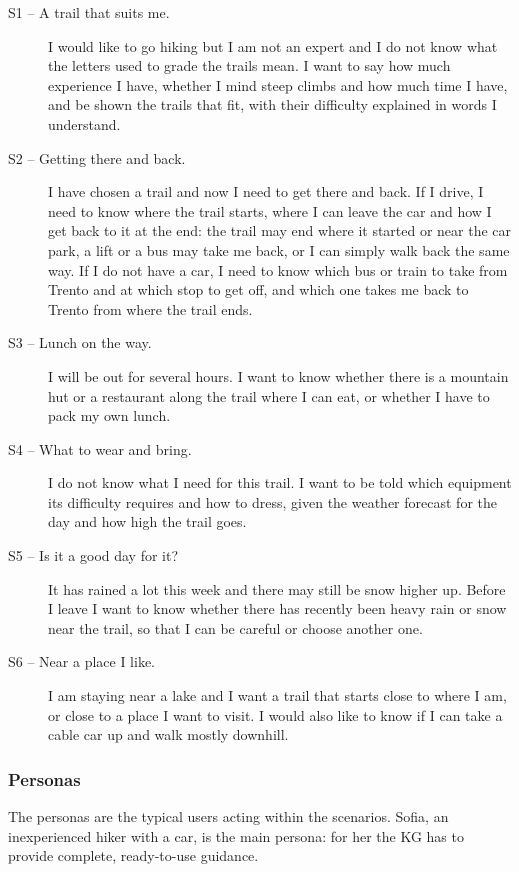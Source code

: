 \begin{description}
    \item[S1 -- A trail that suits me.] I would like to go hiking but I am not an expert and I do not know what the letters used to grade the trails mean. I want to say how much experience I have, whether I mind steep climbs and how much time I have, and be shown the trails that fit, with their difficulty explained in words I understand.
    \item[S2 -- Getting there and back.] I have chosen a trail and now I need to get there and back. If I drive, I need to know where the trail starts, where I can leave the car and how I get back to it at the end: the trail may end where it started or near the car park, a lift or a bus may take me back, or I can simply walk back the same way. If I do not have a car, I need to know which bus or train to take from Trento and at which stop to get off, and which one takes me back to Trento from where the trail ends.
    \item[S3 -- Lunch on the way.] I will be out for several hours. I want to know whether there is a mountain hut or a restaurant along the trail where I can eat, or whether I have to pack my own lunch.
    \item[S4 -- What to wear and bring.] I do not know what I need for this trail. I want to be told which equipment its difficulty requires and how to dress, given the weather forecast for the day and how high the trail goes.
    \item[S5 -- Is it a good day for it?] It has rained a lot this week and there may still be snow higher up. Before I leave I want to know whether there has recently been heavy rain or snow near the trail, so that I can be careful or choose another one.
    \item[S6 -- Near a place I like.] I am staying near a lake and I want a trail that starts close to where I am, or close to a place I want to visit. I would also like to know if I can take a cable car up and walk mostly downhill.
\end{description}

\subsubsection{Personas}
\label{sec:personas}
The personas are the typical users acting within the scenarios. Sofia, an inexperienced hiker with a car, is the main persona: for her the KG has to provide complete, ready-to-use guidance.

